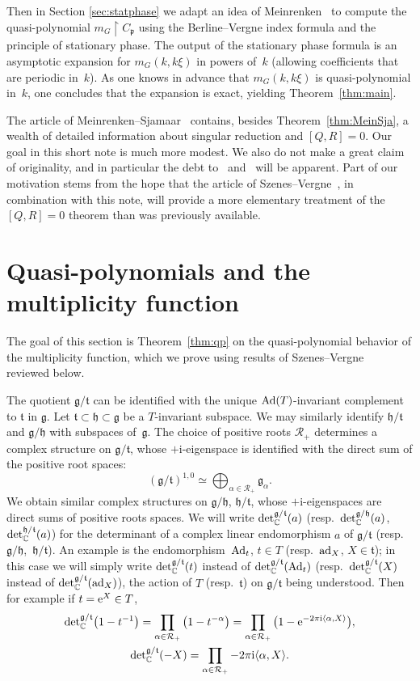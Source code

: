 \documentclass[pdftex]{sigma}
\numberwithin{equation}{section}
\newcommand{\pair}[2]{\langle #1, #2 \rangle}
\newcommand{\tn}[1]{\textnormal{#1}}
\renewcommand{\i}{{\mathrm{i}}}
\def\Ad{\ensuremath{\textnormal{Ad}}}
\def\ad{\ensuremath{\textnormal{ad}}}
\def\g{\ensuremath{\mathfrak{g}}}
\def\t{\ensuremath{\mathfrak{t}}}
\def\h{\ensuremath{\mathfrak{h}}}
\def\p{\ensuremath{\mathfrak{p}}}
\def\R{\ensuremath{\mathcal{R}}}
\def\bC{\ensuremath{\mathbb{C}}}
\def\de{\ensuremath{\tn{det}_\bC}}
\begin{document}
Then in Section \ref{sec:statphase} we adapt an idea of Meinrenken~\cite{MeinrenkenAsymptotic} to compute the quasi-polynomial $m_G \upharpoonright C_\p$ using the Berline--Vergne index formula and the principle of stationary phase. The output of the stationary phase formula is an asymptotic expansion for $m_G(k,k\xi)$ in powers of~$k$ (allowing coefficients that are periodic in~$k$). As one knows in advance that $m_G(k,k\xi)$ is quasi-polynomial in~$k$, one concludes that the expansion is exact, yielding Theorem~\ref{thm:main}.

The article of Meinrenken--Sjamaar~\cite{MeinrenkenSjamaar} contains, besides Theorem~\ref{thm:MeinSja}, a wealth of detailed information about singular reduction and $[Q,R]=0$. Our goal in this short note is much more modest. We also do not make a great claim of originality, and in particular the debt to~\cite{SzenesVergne2010} and~\cite{MeinrenkenAsymptotic} will be apparent. Part of our motivation stems from the hope that the article of Szenes--Vergne~\cite{SzenesVergne2010}, in combination with this note, will provide a more elementary treatment of the $[Q,R]=0$ theorem than was previously available.

\section{Quasi-polynomials and the multiplicity function}\label{sec:mult}
The goal of this section is Theorem~\ref{thm:qp} on the quasi-polynomial behavior of the multiplicity function, which we prove using results of Szenes--Vergne~\cite{SzenesVergne2010} reviewed below.

The quotient $\g/\t$ can be identified with the unique $\Ad(T)$-invariant complement to $\t$ in $\g$. Let $\t \subset \h \subset \g$ be a $T$-invariant subspace. We may similarly identify $\h/\t$ and $\g/\h$ with subspaces of~$\g$. The choice of positive roots $\R_+$ determines a complex structure on $\g/\t$, whose $+\i$-eigenspace is identified with the direct sum of the positive root spaces:
\[ (\g/\t)^{1,0}\simeq \bigoplus_{\alpha \in \R_+} \g_\alpha.\]
We obtain similar complex structures on $\g/\h$, $\h/\t$, whose $+\i$-eigenspaces are direct sums of positive roots spaces. We will write $\de^{\g/\t}(a)$ (resp.~$\de^{\g/\h}(a)$, $\de^{\h/\t}(a)$) for the determinant of a complex linear endomorphism $a$ of $\g/\t$ (resp.~$\g/\h$,~$\h/\t$). An example is the endomorphism~$\Ad_t$, $t \in T$ (resp.~$\ad_X$, $X \in \t$); in this case we will simply write $\de^{\g/\t}(t)$ instead of $\de^{\g/\t}(\Ad_t)$ (resp.~$\de^{\g/\t}(X)$ instead of $\de^{\g/\t}(\ad_X)$), the action of $T$ (resp.~$\t$) on $\g/\t$ being understood. Then for example if $t={\rm e}^X \in T$,
\begin{gather*} \de^{\g/\t}\big(1-t^{-1}\big)=\prod_{\alpha \in \R_+}\big(1-t^{-\alpha}\big)=\prod_{\alpha \in \R_+}\big(1-{\rm e}^{-2\pi \i \pair{\alpha}{X}}\big), \\
 \de^{\g/\t}(-X)=\prod_{\alpha \in \R_+} -2\pi \i \pair{\alpha}{X}.\end{gather*}
\end{document}
